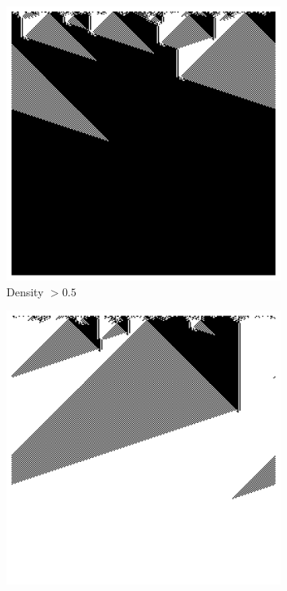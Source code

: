 \begin{figure}[htbp]
  \centering
  \begin{subfigure}[b]{.4\linewidth}
    \centering
    \includegraphics[width=\linewidth]{figures/particle_ca_full.png}
    \caption{Density $> 0.5$}
    \label{fig:particle_ca_full}
  \end{subfigure}
  \hspace{10pt}
  \begin{subfigure}[b]{.4\linewidth}
    \centering
    \includegraphics[width=\linewidth]{figures/particle_ca_empty.png}

\end{subfigure}
\end{figure}
